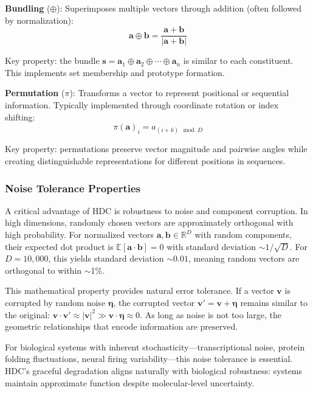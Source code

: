\documentclass[12pt]{article}
\begin{document}
\textbf{Bundling} ($\oplus$): Superimposes multiple vectors through addition (often followed by normalization):
\begin{equation}
\mathbf{a} \oplus \mathbf{b} = \frac{\mathbf{a} + \mathbf{b}}{|\mathbf{a} + \mathbf{b}|}
\end{equation}

Key property: the bundle $\mathbf{s} = \mathbf{a}_1 \oplus \mathbf{a}_2 \oplus \cdots \oplus \mathbf{a}_n$ is similar to each constituent. This implements set membership and prototype formation.

\textbf{Permutation} ($\pi$): Transforms a vector to represent positional or sequential information. Typically implemented through coordinate rotation or index shifting:
\begin{equation}
\pi(\mathbf{a})_i = a_{(i + k) \mod D}
\end{equation}

Key property: permutations preserve vector magnitude and pairwise angles while creating distinguishable representations for different positions in sequences.

\subsubsection{Noise Tolerance Properties}

A critical advantage of HDC is robustness to noise and component corruption. In high dimensions, randomly chosen vectors are approximately orthogonal with high probability. For normalized vectors $\mathbf{a}, \mathbf{b} \in \mathbb{R}^D$ with random components, their expected dot product is $\mathbb{E}[\mathbf{a} \cdot \mathbf{b}] = 0$ with standard deviation $\sim 1/\sqrt{D}$. For $D = 10,000$, this yields standard deviation $\sim 0.01$, meaning random vectors are orthogonal to within $\sim$1\%.

This mathematical property provides natural error tolerance. If a vector $\mathbf{v}$ is corrupted by random noise $\boldsymbol{\eta}$, the corrupted vector $\mathbf{v}' = \mathbf{v} + \boldsymbol{\eta}$ remains similar to the original: $\mathbf{v} \cdot \mathbf{v}' \approx |\mathbf{v}|^2 \gg \mathbf{v} \cdot \boldsymbol{\eta} \approx 0$. As long as noise is not too large, the geometric relationships that encode information are preserved.

For biological systems with inherent stochasticity—transcriptional noise, protein folding fluctuations, neural firing variability—this noise tolerance is essential. HDC's graceful degradation aligns naturally with biological robustness: systems maintain approximate function despite molecular-level uncertainty.
\end{document}
